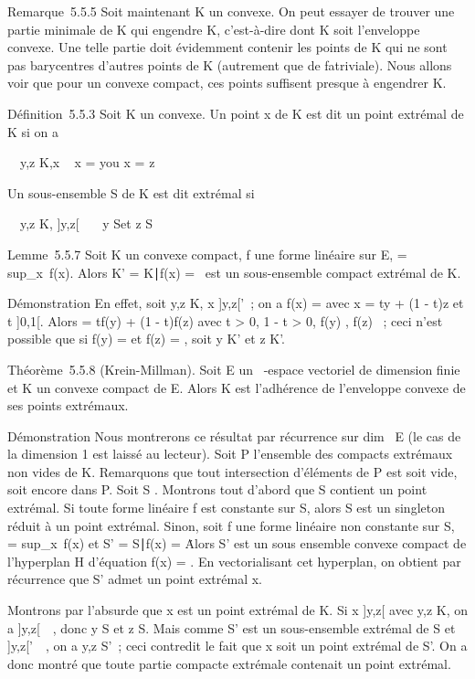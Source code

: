 \documentclass[]{article}
\begin{document}
Remarque~5.5.5 Soit maintenant K un convexe. On peut essayer de trouver
une partie minimale de K qui engendre K, c'est-à-dire dont K soit
l'enveloppe convexe. Une telle partie doit évidemment contenir les
points de K qui ne sont pas barycentres d'autres points de K (autrement
que de fa\ccon triviale). Nous allons voir que pour
un convexe compact, ces points suffisent presque à engendrer K.

Définition~5.5.3 Soit K un convexe. Un point x de K est dit un point
extrémal de K si on a

\forall~~y,z \in K,\quad x \in [y,z] \rigtharrow~
x = y\text ou x = z

Un sous-ensemble S de K est dit extrémal si

\forall~~y,z \in K,\quad
]y,z[\bigcapS\neq~\varnothing~\rigtharrow~ y \in S\text et
z \in S

Lemme~5.5.7 Soit K un convexe compact, f une forme linéaire sur E, \mu
= sup_x\inK~f(x). Alors K' =
\x \in K∣f(x) =
\mu\ est un sous-ensemble compact extrémal de K.

Démonstration En effet, soit y,z \in K, x \in]y,z[\bigcapK'~; on a f(x) = \mu
avec x = ty + (1 - t)z et t \in]0,1[. Alors \mu = tf(y) + (1 - t)f(z)
avec t > 0, 1 - t > 0, f(y) \leq \mu, f(z) \leq \mu~;
ceci n'est possible que si f(y) = \mu et f(z) = \mu, soit y \in K' et z \in K'.

Théorème~5.5.8 (Krein-Millman). Soit E un ~-espace vectoriel de
dimension finie et K un convexe compact de E. Alors K est l'adhérence de
l'enveloppe convexe de ses points extrémaux.

Démonstration Nous montrerons ce résultat par récurrence sur
dim~ E (le cas de la dimension 1 est laissé au
lecteur). Soit P l'ensemble des compacts extrémaux non vides de K.
Remarquons que tout intersection d'éléments de P est soit vide, soit
encore dans P. Soit S \inP. Montrons tout d'abord que S contient un point
extrémal. Si toute forme linéaire f est constante sur S, alors S est un
singleton réduit à un point extrémal. Sinon, soit f une forme linéaire
non constante sur S, \mu = sup_x\inS~f(x)
et S' = \x \in S∣f(x) =
\mu\. Alors S' est un sous ensemble convexe compact de
l'hyperplan H d'équation f(x) = \mu. En vectorialisant cet hyperplan, on
obtient par récurrence que S' admet un point extrémal x.

Montrons par l'absurde que x est un point extrémal de K. Si x \in]y,z[
avec y,z \in K, on a ]y,z[\bigcapS\neq~\varnothing~, donc y \in S
et z \in S. Mais comme S' est un sous-ensemble extrémal de S et
]y,z[\bigcapS'\neq~\varnothing~, on a y,z \in S'~; ceci
contredit le fait que x soit un point extrémal de S'. On a donc montré
que toute partie compacte extrémale contenait un point extrémal.
\end{document}
